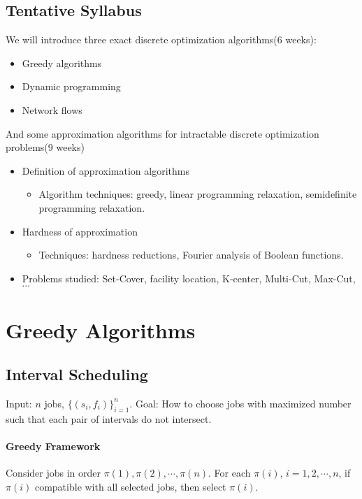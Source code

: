 \subsection{Tentative Syllabus}
We will introduce three exact discrete optimization algorithms(6 weeks):
\begin{itemize}
    \item Greedy algorithms
    \item Dynamic programming
    \item Network flows
\end{itemize}
And some approximation algorithms for intractable discrete optimization problems(9 weeks)
\begin{itemize}
    \item Definition of approximation algorithms
    \begin{itemize}
        \item Algorithm techniques: greedy, linear programming relaxation, semidefinite programming relaxation.
    \end{itemize}
    \item Hardness of approximation 
    \begin{itemize}
        \item Techniques: hardness reductions, Fourier analysis of Boolean functions.
    \end{itemize}
    \item Problems studied: Set-Cover, facility location, K-center, Multi-Cut, Max-Cut, $  \cdots $ 
\end{itemize}
\section{Greedy Algorithms}
\subsection{Interval Scheduling}
\begin{example}
    Input:  $ n  $ jobs,  $\{ (s_i,f_i)\}_{i=1}^n $. Goal: How to choose jobs with maximized number such that each pair of  intervals do not intersect. 
\end{example}
\paragraph{Greedy Framework}
Consider jobs in order  $ \pi(1),\pi(2),\cdots,\pi(n) $. For each  $ \pi(i) $,  $ i=1,2,\cdots,n $, if  $ \pi(i) $ compatible with all selected jobs, then select  $ \pi(i) $.

